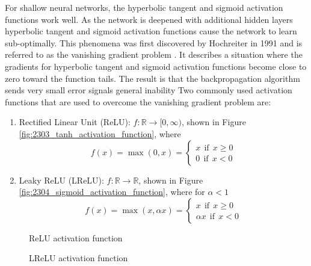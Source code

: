 For shallow neural networks, the hyperbolic tangent and sigmoid activation functions work well. As the network is deepened with additional hidden layers hyperbolic tangent and sigmoid activation functions  cause the network to learn sub-optimally. This phenomena was first discovered by Hochreiter in 1991 and is referred to as the vanishing gradient problem \cite{Hochreiter1991}. It describes a situation where the gradients for hyperbolic tangent and sigmoid activation functions become close to zero toward the function tails. The result is that the backpropagation algorithm sends very small error signals general inability  Two commonly used activation functions that are used to overcome the vanishing gradient problem are:
\begin{enumerate}
	\item Rectified Linear Unit (ReLU): $f:\mathbb{R} \to [0,\infty)$, shown in Figure \ref{fig:2303_tanh_activation_function}, where
	\begin{equation}
		f(x) = \max(0,x) = \begin{cases}
							x \ \ \text{if} \ \ x \geq 0 \\
							0 \ \ \text{if} \ \ x < 0	
						   \end{cases}
	\end{equation}
	\item Leaky ReLU (LReLU): $f:\mathbb{R} \to \mathbb{R}$, shown in Figure \ref{fig:2304_sigmoid_activation_function}, where for $\alpha < 1$
	\begin{equation}
		f(x) = \max(x, \alpha x) =   \begin{cases}
									  x \ \ \text{if} \ \ x \geq 0 \\
									 \alpha x \ \ \text{if} \ \ x < 0	
			   						 \end{cases}
	\end{equation}
\end{enumerate}

\begin{figure}[h]
	\centering
	\begin{minipage}[t]{0.45\textwidth}
		\centering
		
		\caption[ReLU activation function]{ReLU activation function}
		\label{fig:2305_relu_activation_function}
	\end{minipage}
	\hspace{1cm}
	\begin{minipage}[t]{0.45\textwidth}
		\centering
		
		\caption[LReLU activation function]{LReLU activation function}
		\label{fig:2306_lrelu_activation_function}
	\end{minipage}
\end{figure}


